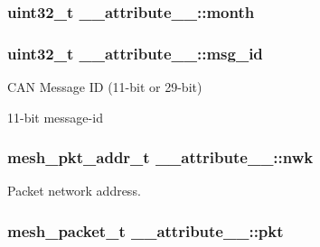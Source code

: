 \subsubsection[{\texorpdfstring{month}{month}}]{\setlength{\rightskip}{0pt plus 5cm}uint32\+\_\+t \+\_\+\+\_\+attribute\+\_\+\+\_\+\+::month}\hypertarget{struct____attribute_____a59b2a1f42969a6800f7cd16b75ec328f}{}\label{struct____attribute_____a59b2a1f42969a6800f7cd16b75ec328f}
\subsubsection[{\texorpdfstring{msg\+\_\+id}{msg_id}}]{\setlength{\rightskip}{0pt plus 5cm}uint32\+\_\+t \+\_\+\+\_\+attribute\+\_\+\+\_\+\+::msg\+\_\+id}\hypertarget{struct____attribute_____a676a49f79047392e2bac357a55bb74ed}{}\label{struct____attribute_____a676a49f79047392e2bac357a55bb74ed}


C\+AN Message ID (11-\/bit or 29-\/bit) 

11-\/bit message-\/id 
\subsubsection[{\texorpdfstring{nwk}{nwk}}]{\setlength{\rightskip}{0pt plus 5cm}mesh\+\_\+pkt\+\_\+addr\+\_\+t \+\_\+\+\_\+attribute\+\_\+\+\_\+\+::nwk}\hypertarget{struct____attribute_____acca30e839928f53cd58dad5de67e9179}{}\label{struct____attribute_____acca30e839928f53cd58dad5de67e9179}


Packet network address. 

\subsubsection[{\texorpdfstring{pkt}{pkt}}]{\setlength{\rightskip}{0pt plus 5cm}mesh\+\_\+packet\+\_\+t \+\_\+\+\_\+attribute\+\_\+\+\_\+\+::pkt}\hypertarget{struct____attribute_____a09b2479a59537aae24561247294fa398}{}\label{struct____attribute_____a09b2479a59537aae24561247294fa398}


